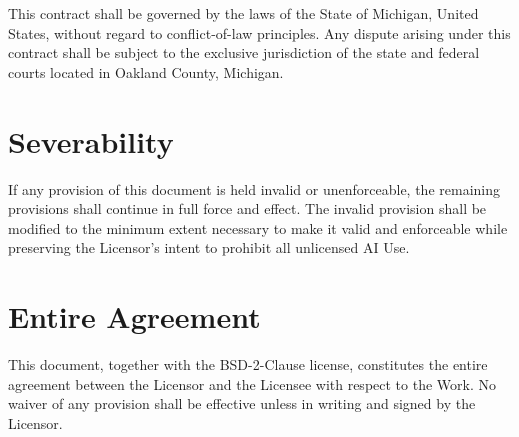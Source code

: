 \documentclass[11pt]{article}
\begin{document}
This contract shall be governed by the laws of the State of
Michigan, United States, without regard to conflict-of-law
principles.  Any dispute arising under this contract shall be
subject to the exclusive jurisdiction of the state and federal
courts located in Oakland County, Michigan.

\section{Severability}

If any provision of this document is held invalid or unenforceable,
the remaining provisions shall continue in full force and effect.
The invalid provision shall be modified to the minimum extent
necessary to make it valid and enforceable while preserving the
Licensor's intent to prohibit all unlicensed AI Use.

\section{Entire Agreement}

This document, together with the BSD-2-Clause license, constitutes
the entire agreement between the Licensor and the Licensee with
respect to the Work.  No waiver of any provision shall be effective
unless in writing and signed by the Licensor.
\end{document}
